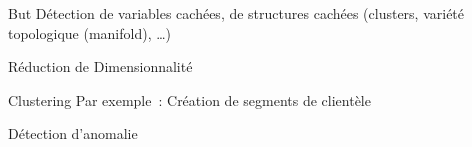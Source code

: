 \begin{frame}{But}
  Détection de variables cachées, de \og{}structures\fg{} cachées (clusters, variété topologique (manifold), …)

  \begin{minipage}[l]{0.69\linewidth}
  \end{minipage}\hfill
  \begin{minipage}[l]{0.29\linewidth}
  \end{minipage}\hfill
\end{frame}

\begin{frame}{Réduction de Dimensionnalité}
\end{frame}

\begin{frame}{Clustering}
  Par exemple~: Création de segments de clientèle
\end{frame}

\begin{frame}{Détection d'anomalie}
\end{frame}
